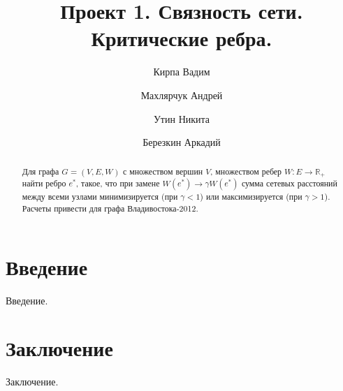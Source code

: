 \documentclass{article}
\begin{document}
\title{Проект 1. Связность сети. Критические ребра.}

\author{
  Кирпа Вадим
  \and
  Махлярчук Андрей
  \and
  Утин Никита
  \and
  Березкин Аркадий
}

\maketitle
\thispagestyle{empty}
\newpage

\begin{abstract}
Для графа $G = (V, E, W)$ с множеством вершин $V$,
множеством ребер $W: E \rightarrow \mathbb{R}_+$
найти ребро $e^*$, такое, что при замене 
$W(e^*) \rightarrow \gamma W(e^*)$ сумма сетевых
расстояний между всеми узлами минимизируется
(при $\gamma < 1$) или максимизируется (при $\gamma > 1$).
Расчеты привести для графа Владивостока-2012.
\end{abstract}

\newpage

\section{Введение}
Введение.

\section{Заключение}
Заключение.
\end{document}

